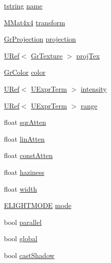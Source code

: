 \begin{CompactItemize}
\item 
\hyperlink{common__afx_8h_816fa58fd77499b0edb2c69ebe803d5c}{tstring} \hyperlink{struct_s_light_info_7af3604ff1142b810497a8c5260e6cfb}{name}
\item 
\hyperlink{class_m_mat4x4}{MMat4x4} \hyperlink{struct_s_light_info_7c2667c93e4ec8b5bda44f39f97fb629}{transform}
\item 
\hyperlink{class_gr_projection}{GrProjection} \hyperlink{struct_s_light_info_f22ba7c3f8c8ca55f5da12d61aafb81a}{projection}
\item 
\hyperlink{class_u_ref}{URef}$<$ \hyperlink{class_gr_texture}{GrTexture} $>$ \hyperlink{struct_s_light_info_642dfd4d0aa9dd701ace805d95e5449b}{projTex}
\item 
\hyperlink{class_gr_color}{GrColor} \hyperlink{struct_s_light_info_dd473b66bc8d906709a0b6cac00b1cf5}{color}
\item 
\hyperlink{class_u_ref}{URef}$<$ \hyperlink{class_u_expr_term}{UExprTerm} $>$ \hyperlink{struct_s_light_info_086fba67bb218313e6fb4d847fca2c7b}{intensity}
\item 
\hyperlink{class_u_ref}{URef}$<$ \hyperlink{class_u_expr_term}{UExprTerm} $>$ \hyperlink{struct_s_light_info_6e6773eee19ee9da44997768f8d77566}{range}
\item 
float \hyperlink{struct_s_light_info_2d5f5d37ba45e45ca2e311e4d4c04491}{sqrAtten}
\item 
float \hyperlink{struct_s_light_info_1bd8a695b7e702cb94afb98baa608491}{linAtten}
\item 
float \hyperlink{struct_s_light_info_926cc2b70cbc204a58b7eedc7c6d323e}{constAtten}
\item 
float \hyperlink{struct_s_light_info_df2fa81977b29ac3e37450ffaedf965c}{haziness}
\item 
float \hyperlink{struct_s_light_info_0b94e57ebcf7a284530d822145cd62e1}{width}
\item 
\hyperlink{_gr_light_8h_8874b04c94d261f583fc693b4d7c866e}{ELIGHTMODE} \hyperlink{struct_s_light_info_78ee5f1900b538a2ab102f3db65a9b46}{mode}
\item 
bool \hyperlink{struct_s_light_info_ecbb1cd068a1abd41dfdd9b0da62b7c5}{parallel}
\item 
bool \hyperlink{struct_s_light_info_6fd689b605dab56da126d26a09bba6c9}{global}
\item 
bool \hyperlink{struct_s_light_info_1751091736d0b2681bdcb93e78ed9441}{castShadow}
\end{CompactItemize}


